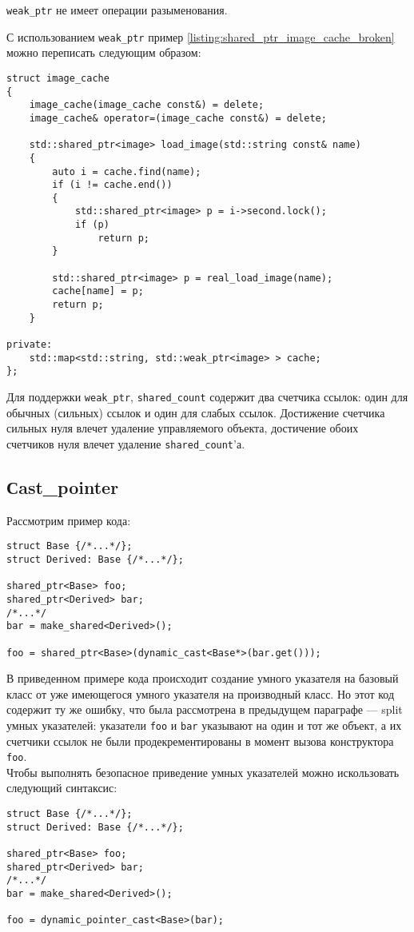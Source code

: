 \texttt{weak_ptr} не имеет операции разыменования.

С использованием \texttt{weak_ptr} пример \ref{listing:shared_ptr_image_cache_broken} можно переписать следующим образом:

\begin{verbatim}
struct image_cache
{
    image_cache(image_cache const&) = delete;
    image_cache& operator=(image_cache const&) = delete;

    std::shared_ptr<image> load_image(std::string const& name)
    {
        auto i = cache.find(name);
        if (i != cache.end())
        {
            std::shared_ptr<image> p = i->second.lock();
            if (p)
                return p;
        }
            
        std::shared_ptr<image> p = real_load_image(name);
        cache[name] = p;
        return p;
    }

private:
    std::map<std::string, std::weak_ptr<image> > cache;
};
\end{verbatim}

Для поддержки \texttt{weak_ptr}, \texttt{shared_count} содержит два счетчика ссылок: один для обычных (сильных) ссылок и один для слабых ссылок. Достижение счетчика сильных нуля влечет удаление управляемого объекта, достичение обоих счетчиков нуля влечет удаление \texttt{shared_count}'а.

\subsection{Сast\_pointer}
Рассмотрим пример кода:
\begin{verbatim}
struct Base {/*...*/};
struct Derived: Base {/*...*/};

shared_ptr<Base> foo;
shared_ptr<Derived> bar;
/*...*/
bar = make_shared<Derived>();

foo = shared_ptr<Base>(dynamic_cast<Base*>(bar.get()));
\end{verbatim}
В приведенном примере кода происходит создание умного указателя на базовый класс от уже имеющегося умного указателя на производный класс. Но этот код содержит ту же ошибку, что была рассмотрена в предыдущем параграфе --- split умных указателей: указатели \texttt{foo} и \texttt{bar} указывают на один и тот же объект, а их счетчики ссылок не были продекрементированы в момент вызова конструктора \texttt{foo}. \\ Чтобы выполнять безопасное приведение умных указателей можно искользовать следующий синтаксис:
\begin{verbatim}
struct Base {/*...*/};
struct Derived: Base {/*...*/};

shared_ptr<Base> foo;
shared_ptr<Derived> bar;
/*...*/
bar = make_shared<Derived>();

foo = dynamic_pointer_cast<Base>(bar);
\end{verbatim}

